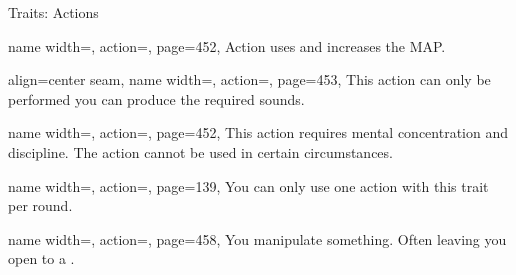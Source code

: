 \renewcommand{\PageBottomReferences}{%
    \hfill LCR = Legacy Core Rulebook
    \hfill DA = Dark Archive
    \hfill GnM = Gods and magic
    \hfill GMC = GM Core\\
    \hfill SoM = Secrets of Magic
    \hfill GG = Guns \& Gears
    \hfill TV = Treasure Vault
    \hfill AG = Ancesty Guide
    \hfill ME = Magwani Expanse
    \hfill Le = Ledgends
}%
\setlength{\parindent}{0mm}%
\begin{PageFront}
    \begin{Tables}{\frontTableHeight}
        \begin{Table}{Traits: Actions}
            \begin{entry}{}{%
                name width=\conditionLength,%
                action=\Attack,
                page=452,
            }
                Action uses  and increases the MAP. \hfill{}
            \end{entry}
            \begin{entry}{}{%
                align=center seam,
                name width=\conditionLength,%
                action=\Auditory,
                page=453,
            }
                This action can only be performed you can produce the required sounds.\\ 
            \end{entry}
            \begin{entry}{}{%
                name width=\conditionLength,%
                action=\Concentrate,
                page=452,
            }
                This action requires mental concentration and discipline. The action cannot be used in certain
                circumstances.
            \end{entry}
            \begin{entry}{}{%
                name width=\conditionLength,%
                action=\Flourish,
                page=139,
            }
                You can only use one action with this trait per round.
            \end{entry}
            \begin{entry}{}{%
                name width=\conditionLength,%
                action=\Manipulate,
                page=458,
            }
                You manipulate something. Often leaving you open to a .

\end{entry}
\end{Table}
\end{Tables}
\end{PageFront}
